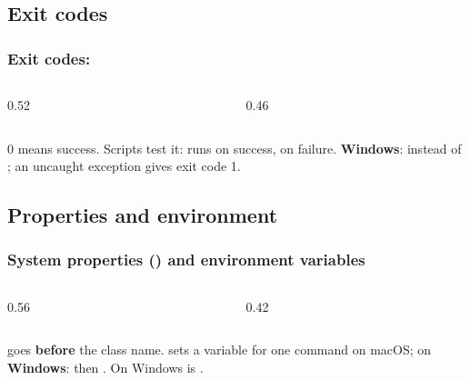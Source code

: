 \documentclass[aspectratio=169,10pt,compress]{beamer}
\newcommand{\win}{\textbf{Windows}}
\begin{document}
\subsection[Exit codes]{Exit codes}




\begin{frame}[t,fragile] \frametitle{Exit codes: }
  \begin{columns}[T]
    \begin{column}{0.52\textwidth}
    \end{column}
    \begin{column}{0.46\textwidth}
    \end{column}
  \end{columns}

  \vspace{0.1em}
  \small 0 means success. Scripts test it: \hCode{\&\&} runs on success, \hCode{||} on failure.
  \win:  instead of ; an uncaught exception gives exit code 1.
\end{frame}

\subsection[Properties]{Properties and environment}




\begin{frame}[t,fragile] \frametitle{System properties () and environment variables}
  \begin{columns}[T]
    \begin{column}{0.56\textwidth}
    \end{column}
    \begin{column}{0.42\textwidth}
    \end{column}
  \end{columns}

  \vspace{0.1em}
  \small {} goes \textbf{before} the class name.  sets a variable for one
  command on macOS; on \win:  then . On Windows  is \hCode{;}.
\end{frame}
\end{document}
